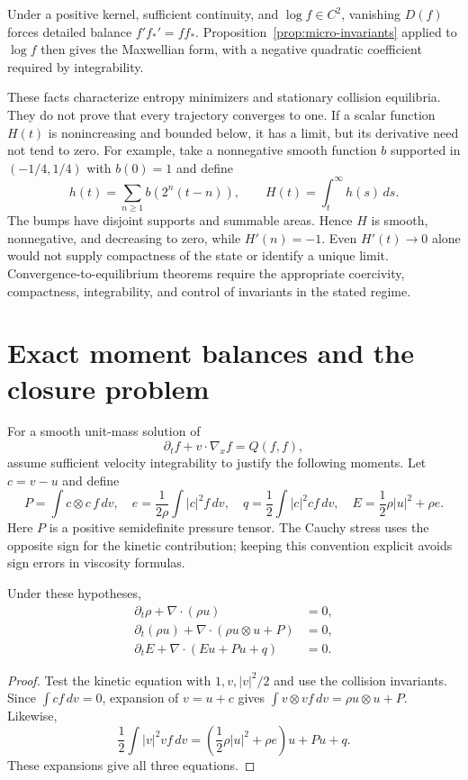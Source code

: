 Under a positive kernel, sufficient continuity, and $\log f\in C^2$,
vanishing $D(f)$ forces detailed balance
$f'f_*'=ff_*$.  Proposition~\ref{prop:micro-invariants} applied to
$\log f$ then gives the Maxwellian form, with a negative quadratic
coefficient required by integrability.

These facts characterize entropy minimizers and stationary collision
equilibria.  They do not prove that every trajectory converges to one.
If a scalar function $H(t)$ is nonincreasing and bounded below, it
has a limit, but its derivative need not tend to zero.  For example,
take a nonnegative smooth function $b$ supported in $(-1/4,1/4)$
with $b(0)=1$ and define
\[
 h(t)=\sum_{n\ge1}b(2^n(t-n)),\qquad
 H(t)=\int_t^\infty h(s)\,ds.
\]
The bumps have disjoint supports and summable areas.  Hence $H$ is
smooth, nonnegative, and decreasing to zero, while $H'(n)=-1$.
Even $H'(t)\to0$ alone would not supply compactness of the state
or identify a unique limit.  Convergence-to-equilibrium theorems require
the appropriate coercivity, compactness, integrability, and control of
invariants in the stated regime.

\section{Exact moment balances and the closure problem}

For a smooth unit-mass solution of
\[
 \partial_tf+v\cdot\nabla_xf=Q(f,f),
\]
assume sufficient velocity integrability to justify the following
moments.  Let $c=v-u$ and define
\[
 P=\int c\otimes c\,f\,dv,\quad
 e=\frac1{2\rho}\int|c|^2f\,dv,\quad
 q=\frac12\int|c|^2c f\,dv,
 \quad E=\frac12\rho|u|^2+\rho e.
\]
Here $P$ is a positive semidefinite pressure tensor.  The Cauchy stress
uses the opposite sign for the kinetic contribution; keeping this
convention explicit avoids sign errors in viscosity formulas.

\begin{proposition}
\label{prop:micro-moments}
Under these hypotheses,
\begin{align}
 \partial_t\rho+\nabla\cdot(\rho u)&=0,
 \label{eq:micro-mass}\\
 \partial_t(\rho u)+\nabla\cdot(\rho u\otimes u+P)&=0,
 \label{eq:micro-momentum}\\
 \partial_tE+\nabla\cdot(Eu+Pu+q)&=0.
 \label{eq:micro-energy}
\end{align}
\end{proposition}
\begin{proof}
Test the kinetic equation with $1,v,|v|^2/2$ and use the collision
invariants.  Since $\int cf\,dv=0$, expansion of
$v=u+c$ gives
$\int v\otimes vf\,dv=\rho u\otimes u+P$.
Likewise,
\[
 \frac12\int |v|^2vf\,dv
 =\left(\frac12\rho|u|^2+\rho e\right)u+Pu+q.
\]
These expansions give all three equations.
\end{proof}

